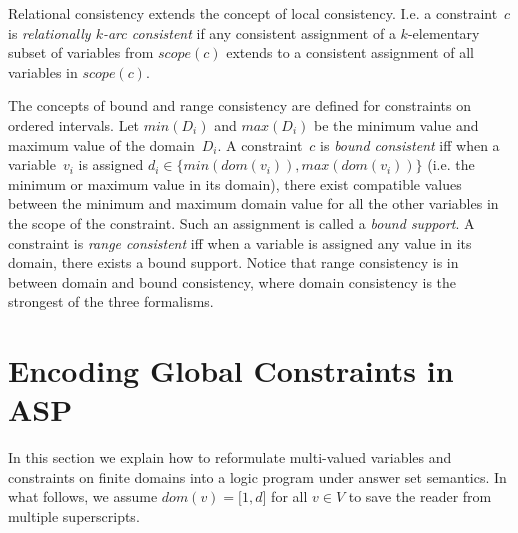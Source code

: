 \documentclass[letterpaper]{article}
\newcommand{\domain}[1]{dom(#1)}
\newcommand{\scope}[1]{scope(#1)}
\begin{document}
Relational consistency \cite{debe97a} extends the concept of local consistency. I.e. a constraint~$c$ is \emph{relationally $k$-arc consistent} if any consistent assignment of a $k$-elementary subset of variables from $\scope{c}$ extends to a consistent assignment of all variables in $\scope{c}$.

The concepts of bound and range consistency are defined for constraints on ordered intervals.
Let $min(D_i)$ and $max(D_i)$ be the minimum value and maximum value of the domain~$D_i$. A constraint~$c$ is \emph{bound consistent} iff when a variable~$v_i$ is assigned $d_i \in \{min(\domain{v_i}), max(\domain{v_i})\}$ (i.e. the minimum or maximum value in its domain), there exist compatible values between the minimum and maximum domain value for all the other variables in the scope of the constraint. Such an assignment is called a \emph{bound support}. A constraint is \emph{range consistent} iff when a variable is assigned any value in its domain, there exists a bound support. Notice that range consistency is in between domain and bound consistency, where domain consistency is the strongest of the three formalisms.


\section{Encoding Global Constraints in ASP}
In this section we explain how to reformulate multi-valued variables and constraints on finite domains into a logic program under answer set semantics. In what follows, we assume $\domain{v} = \lbrack 1, d\rbrack$ for all $v \in V$ to save the reader from multiple superscripts.
\end{document}
